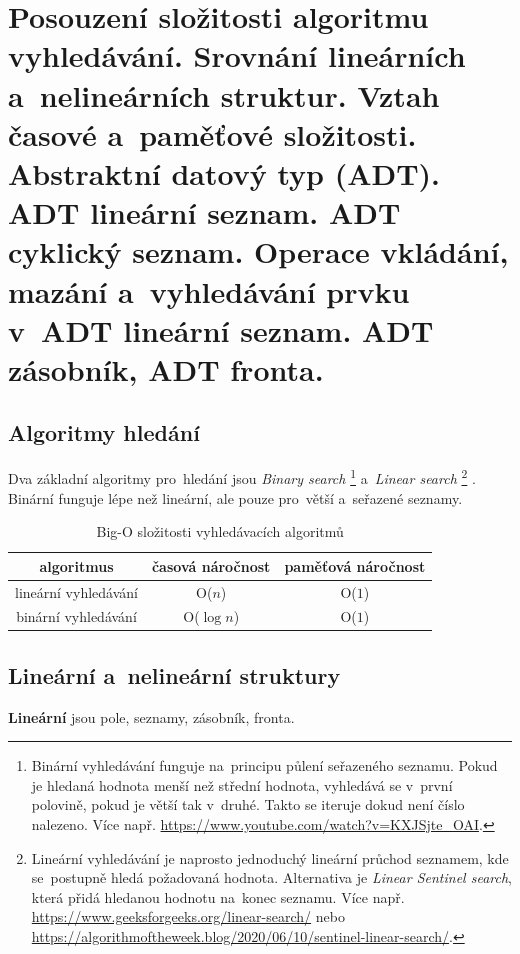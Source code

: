 \clearpage
\section{Posouzení složitosti algoritmu vyhledávání. Srovnání lineárních a~nelineárních struktur. Vztah časové a~paměťové složitosti. Abstraktní datový typ (ADT). ADT lineární seznam. ADT cyklický seznam. Operace vkládání, mazání a~vyhledávání prvku v~ADT lineární seznam. ADT zásobník, ADT fronta.}

\subsection{Algoritmy hledání}

Dva základní algoritmy pro~hledání jsou \textit{Binary search}%
\footnote{Binární vyhledávání funguje na~principu půlení seřazeného seznamu. Pokud je hledaná hodnota menší než střední hodnota, vyhledává se v~první polovině, pokud je větší tak v~druhé. Takto se iteruje dokud není číslo nalezeno. Více např. \url{https://www.youtube.com/watch?v=KXJSjte_OAI}.} %
a~\textit{Linear search}%
\footnote{Lineární vyhledávání je naprosto jednoduchý lineární průchod seznamem, kde se~postupně hledá požadovaná hodnota. Alternativa je \emph{Linear Sentinel search}, která přidá hledanou hodnotu na~konec seznamu. Více např. \url{https://www.geeksforgeeks.org/linear-search/} nebo \url{https://algorithmoftheweek.blog/2020/06/10/sentinel-linear-search/}.}%
. Binární funguje lépe než lineární, ale pouze pro~větší a~seřazené seznamy.

\begin{table}[h]
	\centering
	\caption{Big-O složitosti vyhledávacích algoritmů}
	\begin{tabular}{|c||c|c|}\hline
		algoritmus           & časová náročnost & paměťová náročnost \\\hline\hline
		lineární vyhledávání & O(\( n \))       & O(\( 1 \))         \\\hline
		binární vyhledávání  & O(\( \log n \))  & O(\( 1 \))         \\\hline
	\end{tabular}
\end{table}

\subsection{Lineární a~nelineární struktury}

\textbf{Lineární} jsou pole, seznamy, zásobník, fronta.

